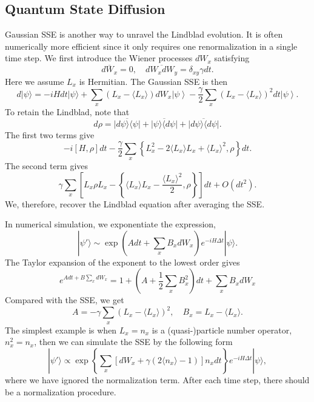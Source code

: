 \documentclass{SciPost}
\begin{document}
\subsection{Quantum State Diffusion}
Gaussian SSE is another way to unravel the Lindblad evolution.
It is often numerically more efficient since it only requires one renormalization in a single time step.
We first introduce the Wiener processes $dW_x$ satisfying 
\begin{equation}
	\overline{dW_x} = 0,\quad \overline{dW_x dW_y} = \delta_{xy} \gamma dt.
\end{equation}
Here we assume $L_x$ is Hermitian. The Gaussian SSE is then
\begin{equation}
	d |\psi\rangle = -i H dt |\psi\rangle + 
	\sum_x \left(L_x-\langle L_x\rangle \right) d W_x \left|\psi\right\rangle - \frac{\gamma}{2} \sum_x  (L_x - \langle L_x \rangle)^2 dt  \left|\psi\right\rangle.
\end{equation}
To retain the Lindblad, note that 
\begin{equation*}
	d\rho = \overline{|d\psi\rangle\langle\psi|} + \overline{|\psi\rangle \langle d\psi|}+ \overline{|d\psi\rangle\langle d\psi|}.
\end{equation*}
The first two terms give
\begin{equation*}
	-i[H,\rho]dt - \frac{\gamma}{2} \sum_x \left\{L_x^2- 2\langle L_x\rangle L_x + \langle L_x\rangle^2,\rho \right\}dt.
\end{equation*}
The second term gives
\begin{equation*}
	\gamma \sum_x \left[L_x \rho L_x  - \left\{\langle L_x\rangle L_x - \frac{\langle L_x\rangle^2}{2},\rho \right\}\right]dt + O(dt^2).
\end{equation*}
We, therefore, recover the Lindblad equation after averaging the SSE.

In numerical simulation, we exponentiate the expression, 
\begin{equation}
	|\psi'\rangle \sim \exp\left(A dt + \sum_x B_x dW_x \right) e^{-iH\Delta t}|\psi\rangle.
\end{equation}
The Taylor expansion of the exponent to the lowest order gives
\begin{equation*}
	e^{A dt + B \sum_x dW_x} = 1 + \left(A + \frac{1}{2} \sum_x B_x^2\right) dt + \sum_x B_x dW_x
\end{equation*}
Compared with the SSE, we get
\begin{equation*}
	A = -\gamma \sum_x (L_x-\langle L_x\rangle)^2,\quad
	B_x = L_x-\langle L_x\rangle.
\end{equation*}
The simplest example is when $L_x = n_x$ is a (quasi-)particle number operator, $n_x^2=n_x$, then we can simulate the SSE by the following form
\begin{equation}
	|\psi'\rangle \propto \exp\left\{\sum_x [dW_x + \gamma (2\langle n_x\rangle-1)]n_x dt \right\} e^{-iH\Delta t}|\psi\rangle,
\end{equation} 
where we have ignored the normalization term. After each time step, there should be a normalization procedure.
\end{document}
